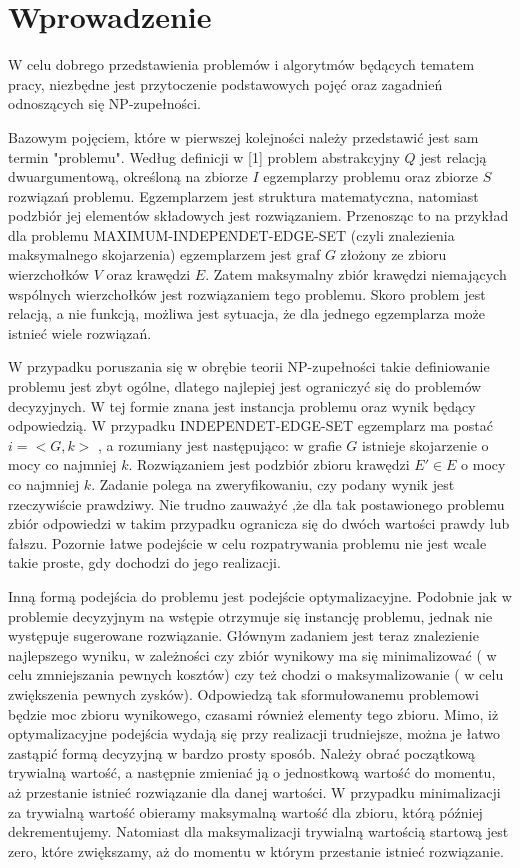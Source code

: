 \chapter{Wprowadzenie}

W celu dobrego przedstawienia problemów i algorytmów będących tematem pracy, niezbędne jest przytoczenie podstawowych pojęć oraz zagadnień odnoszących się NP-zupełności.

Bazowym pojęciem, które w pierwszej kolejności należy przedstawić jest sam termin "problemu". Według definicji w [1] problem abstrakcyjny $Q$ jest relacją dwuargumentową, określoną na zbiorze $I$ egzemplarzy problemu oraz zbiorze $S$ rozwiązań problemu. Egzemplarzem jest struktura matematyczna, natomiast podzbiór jej elementów składowych jest rozwiązaniem. Przenosząc to na przykład dla problemu MAXIMUM-INDEPENDET-EDGE-SET (czyli znalezienia maksymalnego skojarzenia) egzemplarzem jest graf $G$ złożony ze zbioru wierzchołków $V$ oraz krawędzi $E$. Zatem maksymalny zbiór krawędzi niemających wspólnych wierzchołków jest rozwiązaniem tego problemu. Skoro problem jest relacją, a nie funkcją, możliwa jest sytuacja, że dla jednego egzemplarza może istnieć wiele rozwiązań.

W przypadku poruszania się w obrębie teorii NP-zupełności takie definiowanie problemu jest zbyt ogólne, dlatego najlepiej jest ograniczyć się do problemów decyzyjnych. W tej formie znana jest instancja problemu oraz wynik będący odpowiedzią. W przypadku INDEPENDET-EDGE-SET egzemplarz ma postać $i = <G,k>$ , a rozumiany jest następująco: w grafie $G$ istnieje skojarzenie o mocy co najmniej $k$. Rozwiązaniem jest podzbiór zbioru krawędzi $E' \in E$ o mocy co najmniej $k$. Zadanie polega na zweryfikowaniu, czy podany wynik jest rzeczywiście prawdziwy. Nie trudno zauważyć ,że dla tak postawionego problemu zbiór odpowiedzi w takim przypadku ogranicza się do dwóch wartości prawdy lub fałszu. Pozornie łatwe podejście w celu rozpatrywania problemu nie jest wcale takie proste, gdy dochodzi do jego realizacji.
	
Inną formą podejścia do problemu jest podejście optymalizacyjne. Podobnie jak w problemie decyzyjnym na wstępie otrzymuje się instancję problemu, jednak nie występuje sugerowane rozwiązanie. Głównym zadaniem jest teraz znalezienie najlepszego wyniku, w zależności czy zbiór wynikowy ma się minimalizować ( w celu zmniejszania pewnych kosztów) czy też chodzi o maksymalizowanie ( w celu zwiększenia pewnych zysków). Odpowiedzą tak sformułowanemu problemowi będzie moc zbioru wynikowego, czasami również elementy tego zbioru. Mimo, iż optymalizacyjne podejścia wydają się przy realizacji trudniejsze, można je łatwo zastąpić formą decyzyjną w bardzo prosty sposób. Należy obrać początkową trywialną wartość, a następnie zmieniać ją o jednostkową wartość do momentu, aż przestanie istnieć rozwiązanie dla danej wartości. W przypadku minimalizacji za trywialną wartość obieramy maksymalną wartość dla zbioru, którą później dekrementujemy. Natomiast dla maksymalizacji trywialną wartością startową jest zero, które zwiększamy, aż do momentu w którym przestanie istnieć rozwiązanie.

